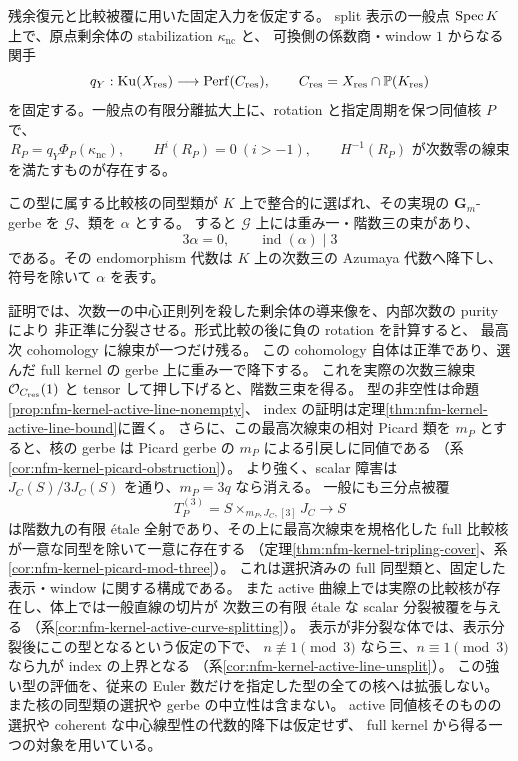 \begin{maintheorem}
残余復元と比較被覆に用いた固定入力を仮定する。
split 表示の一般点 $\operatorname{Spec} K$ 上で、原点剰余体の stabilization $\kappa_{\mathrm{nc}}$ と、
可換側の係数商・window $1$ からなる関手
\[
 q_Y:\operatorname{Ku}(X_{\mathrm{res}})
       \longrightarrow\operatorname{Perf}(C_{\mathrm{res}}),
 \qquad C_{\mathrm{res}}=X_{\mathrm{res}}\cap\mathbb P(K_{\mathrm{res}})
\]
を固定する。一般点の有限分離拡大上に、rotation と指定周期を保つ同値核 $P$ で、
\[
 R_P=q_Y\Phi_P(\kappa_{\mathrm{nc}}),\qquad
 H^{i}(R_P)=0\ (i>-1),\qquad
 H^{-1}(R_P)\text{ が次数零の線束}
\]
を満たすものが存在する。

この型に属する比較核の同型類が $K$ 上で整合的に選ばれ、その実現の
$\mathbf G_m$-gerbe を $\mathcal G$、類を $\alpha$ とする。
すると $\mathcal G$ 上には重み一・階数三の束があり、
\[
 3\alpha=0,\qquad \operatorname{ind}(\alpha)\mid3
\]
である。その endomorphism 代数は $K$ 上の次数三の Azumaya 代数へ降下し、
符号を除いて $\alpha$ を表す。
\end{maintheorem}

証明では、次数一の中心正則列を殺した剰余体の導来像を、内部次数の purity により
非正準に分裂させる。形式比較の後に負の rotation を計算すると、
最高次 cohomology に線束が一つだけ残る。
この cohomology 自体は正準であり、選んだ full kernel の gerbe 上に重み一で降下する。
これを実際の次数三線束 $\mathcal O_{C_{\mathrm{res}}}(1)$ と tensor して押し下げると、階数三束を得る。
型の非空性は命題\ref{prop:nfm-kernel-active-line-nonempty}、
index の証明は定理\ref{thm:nfm-kernel-active-line-bound}に置く。
さらに、この最高次線束の相対 Picard 類を $m_P$ とすると、核の gerbe は
Picard gerbe の $m_P$ による引戻しに同値である
（系\ref{cor:nfm-kernel-picard-obstruction}）。
より強く、scalar 障害は $J_C(S)/3J_C(S)$ を通り、$m_P=3q$ なら消える。
一般にも三分点被覆
\[
 T_P^{(3)}=S\mathbin{\times}_{m_P,J_C,[3]}J_C\longrightarrow S
\]
は階数九の有限 \'etale 全射であり、その上に最高次線束を規格化した
full 比較核が一意な同型を除いて一意に存在する
（定理\ref{thm:nfm-kernel-tripling-cover}、系\ref{cor:nfm-kernel-picard-mod-three}）。
これは選択済みの full 同型類と、固定した表示・window に関する構成である。
また active 曲線上では実際の比較核が存在し、体上では一般直線の切片が
次数三の有限 étale な scalar 分裂被覆を与える
（系\ref{cor:nfm-kernel-active-curve-splitting}）。
表示が非分裂な体では、表示分裂後にこの型となるという仮定の下で、
$n\not\equiv1\pmod3$ なら三、$n\equiv1\pmod3$ なら九が index の上界となる
（系\ref{cor:nfm-kernel-active-line-unsplit}）。
この強い型の評価を、従来の Euler 数だけを指定した型の全ての核へは拡張しない。
また核の同型類の選択や gerbe の中立性は含まない。
active 同値核そのものの選択や coherent な中心線型性の代数的降下は仮定せず、
full kernel から得る一つの対象を用いている。

